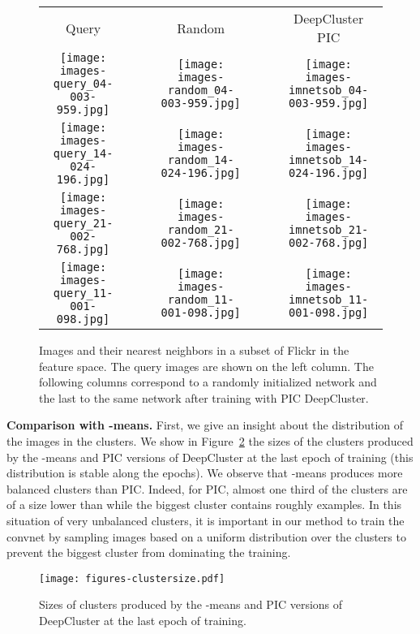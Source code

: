 \documentclass[runningheads]{llncs}
\def\OURS{DeepCluster\xspace}
\begin{document}
\begin{figure}[!h]
\centering

\begin{tabular}{ccccccc}
Query &&& Random &&& \OURS PIC
\\
\texttt{[image: images-query\_04-003-959.jpg]}&&&
\texttt{[image: images-random\_04-003-959.jpg]}&&&
\texttt{[image: images-imnetsob\_04-003-959.jpg]}
\\

 \texttt{[image: images-query\_14-024-196.jpg]}&&&
 \texttt{[image: images-random\_14-024-196.jpg]}&&&
 \texttt{[image: images-imnetsob\_14-024-196.jpg]}
\\
 \texttt{[image: images-query\_21-002-768.jpg]}&&&
 \texttt{[image: images-random\_21-002-768.jpg]}&&&
 \texttt{[image: images-imnetsob\_21-002-768.jpg]}
\\

\texttt{[image: images-query\_11-001-098.jpg]}&&&
\texttt{[image: images-random\_11-001-098.jpg]}&&&
\texttt{[image: images-imnetsob\_11-001-098.jpg]}
\end{tabular}

\caption{Images and their  nearest neighbors in a subset of Flickr in the feature space. The query images are shown on the left column.
 The following  columns correspond to a randomly initialized network and the last  to the same network after training with PIC \OURS.
}
\label{nn-retrieval}
\end{figure}

\noindent\textbf{Comparison with -means.}
First, we give an insight about the distribution of the images in the clusters. 
We show in Figure~\ref{clustersize} the sizes of the clusters produced by the -means and PIC versions of \OURS at the last epoch of training (this distribution is stable along the epochs).
We observe that -means produces more balanced clusters than PIC.
Indeed, for PIC,  almost one third of the clusters are of a size lower than  while the biggest cluster contains roughly  examples.
In this situation of very unbalanced clusters, it is important in our method to train the convnet by sampling images based on a uniform distribution over the clusters to prevent the biggest cluster from dominating the training.

\begin{figure}[!h]
\centering
\texttt{[image: figures-clustersize.pdf]}
\caption{Sizes of clusters produced by the -means and PIC versions of \OURS at the last epoch of training.}
\label{clustersize}
\end{figure}
\end{document}
